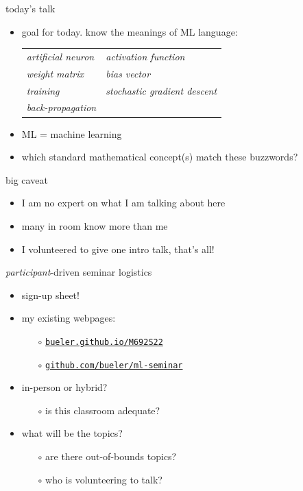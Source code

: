 \documentclass[xcolor={svgnames},
               hyperref={colorlinks,citecolor=DeepPink4,linkcolor=FireBrick,urlcolor=Maroon}]
               {beamer}
\begin{document}
\begin{frame}{today's talk}

\begin{itemize}
\item \alert{goal for today.} know the meanings of ML language:

\medskip
\small
\qquad \begin{tabular}{ll}
\emph{artificial neuron} \qquad & \emph{activation function} \\
\emph{weight matrix} & \emph{bias vector} \\
\emph{training} & \emph{stochastic gradient descent} \\
\emph{back-propagation}
\end{tabular}

\medskip
\item ML = machine learning
\item which standard mathematical concept(s) match these buzzwords?
\end{itemize}
\end{frame}


\begin{frame}{big caveat}

\begin{itemize}
\item I am no expert on what I am talking about here
\item many in room know more than me
\item I volunteered to give one intro talk, that's all!
\end{itemize}
\end{frame}


\begin{frame}{\emph{participant}-driven seminar logistics}

\begin{itemize}
\item sign-up sheet!
\item my existing webpages:
    \begin{itemize}
    \item[$\circ$] \href{http://bueler.github.io/M692S22/index.html}{\texttt{bueler.github.io/M692S22}}
    \item[$\circ$] \href{https://github.com/bueler/ml-seminar}{\texttt{github.com/bueler/ml-seminar}}
    \end{itemize}
\item in-person or hybrid?
    \begin{itemize}
    \item[$\circ$] is this classroom adequate?
    \end{itemize}
\item what will be the topics?
    \begin{itemize}
    \item[$\circ$] are there out-of-bounds topics?
    \item[$\circ$] who is volunteering to talk?
    \end{itemize}
\end{itemize}
\end{frame}
\end{document}
